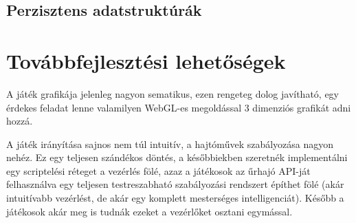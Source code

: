 \documentclass[11pt]{article}
\begin{document}
\subsection{Perzisztens adatstruktúrák}


\section{Továbbfejlesztési lehetőségek}

A játék grafikája jelenleg nagyon sematikus, ezen rengeteg dolog javítható,
egy érdekes feladat lenne valamilyen WebGL-es megoldással 3 dimenziós grafikát
adni hozzá.

A játék irányítása sajnos nem túl intuitív, a hajtóművek szabályozása nagyon
nehéz. Ez egy teljesen szándékos döntés, a későbbiekben szeretnék implementálni
egy scriptelési réteget a vezérlés fölé, azaz a játékosok az űrhajó API-ját
felhasználva egy teljesen testreszabható szabályozási rendszert építhet fölé
(akár intuitívabb vezérlést, de akár egy komplett mesterséges intelligenciát).
Később a játékosok akár meg is tudnák ezeket a vezérlőket osztani egymással.
\end{document}
